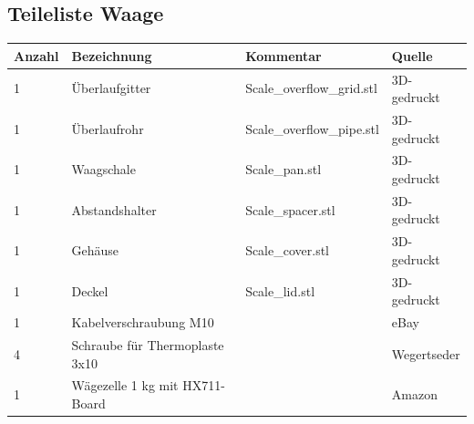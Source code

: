 \documentclass[12pt,letterpaper]{article}
\begin{document}
    \subsection{Teileliste Waage}
        \begin{tabular}{|l|l|l|l|}
    \hline
        Anzahl & Bezeichnung & Kommentar & Quelle \\ \hline
        1 & Überlaufgitter & Scale\_overflow\_grid.stl & 3D-gedruckt \\ \hline
        1 & Überlaufrohr & Scale\_overflow\_pipe.stl & 3D-gedruckt \\ \hline
        1 & Waagschale & Scale\_pan.stl & 3D-gedruckt \\ \hline
        1 & Abstandshalter & Scale\_spacer.stl & 3D-gedruckt \\ \hline
        1 & Gehäuse & Scale\_cover.stl & 3D-gedruckt \\ \hline
        1 & Deckel & Scale\_lid.stl & 3D-gedruckt \\ \hline
        1 & Kabelverschraubung M10 & ~ & eBay \\ \hline
        4 & Schraube für Thermoplaste 3x10 & ~ & Wegertseder \\ \hline
        1 & Wägezelle 1 kg mit HX711-Board & ~ & Amazon \\ \hline
    \end{tabular}
	
\end{document}
